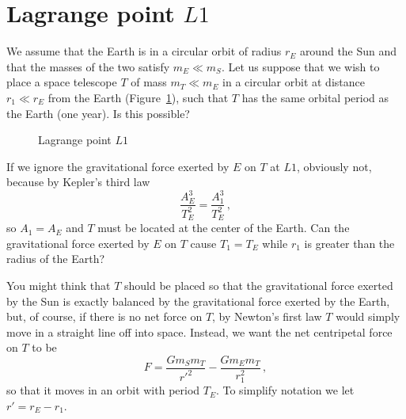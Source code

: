 \section{Lagrange point $L1$}

\enlargethispage{\baselineskip}

We assume that the Earth is in a circular orbit of radius $r_E$ around the Sun and that the masses of the two satisfy $m_E \ll m_S$. Let us suppose that we wish to place a space telescope $T$ of mass $m_T \ll m_E$ in a circular orbit at distance $r_1\ll r_E$ from the Earth (Figure~\ref{f.lagrange1}), such that $T$ has the same orbital period as the Earth (one year). Is this possible?

\begin{figure}
\begin{center}
\end{center}
\caption{Lagrange point $L1$}\label{f.lagrange1}
\end{figure}
If we ignore the gravitational force exerted by $E$ on $T$ at $L1$, obviously not, because by Kepler's third law
\[
\frac{A_E^3}{T_E^2} = \frac{A_1^3}{T_E^2}\,,
\]
so $A_1=A_E$ and $T$ must be located at the center of the Earth. Can the gravitational force exerted by $E$ on $T$ cause $T_1=T_E$ while $r_1$ is greater than the radius of the Earth?

You might think that $T$ should be placed so that the gravitational force exerted by the Sun is exactly balanced by the gravitational force exerted by the Earth, but, of course, if there is no net force on $T$, by Newton's first law $T$ would simply move in a straight line off into space. Instead, we want the net centripetal force on $T$ to be
\begin{equation}
F = \frac{Gm_Sm_T}{r'^2}-\frac{Gm_Em_T}{r_1^2}\,,\label{eqn.force-diff}
\end{equation}
so that it moves in an orbit with period $T_E$. To simplify notation we let $r'=r_E-r_1$.

